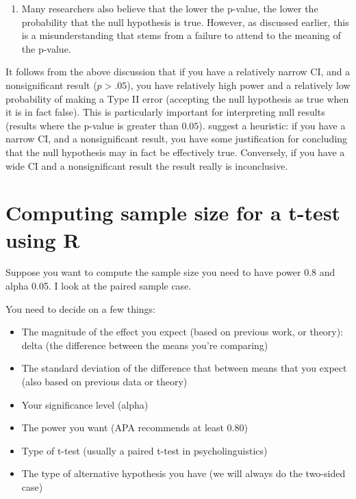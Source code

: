 \documentclass[12pt]{book}\usepackage[]{graphicx}\usepackage[]{color}
\begin{document}
\begin{enumerate}
\item
	Many researchers also believe that the lower the p-value, the lower the probability that the null hypothesis is true. However, as discussed earlier, this is a misunderstanding that stems from a
failure to attend to the meaning of the p-value.
\end{enumerate}

It follows from the above discussion that if you have a relatively narrow CI, and a nonsignificant result
($p > .05$), you have relatively high power and a relatively low
probability of making a Type II error (accepting the null hypothesis
as true when it is in fact false).
This is particularly important for interpreting null results (results where the p-value is greater than $0.05$).
\cite{hoenigheisey} suggest a heuristic: 
if you have a narrow CI, and a
nonsignificant result, you have some justification for concluding that
the null hypothesis may in fact be effectively true. Conversely, if you have a
wide CI and a nonsignificant result the result really is inconclusive.

\section{Computing sample size for a t-test using R}

Suppose you want to compute the sample size you need to have power 0.8 and alpha 0.05. I look at the paired sample case.

You need to decide on a few things:

\begin{itemize}
\item The magnitude of the effect you expect (based on previous work, or theory): delta (the difference between the means you're comparing)
\item  The standard deviation of the difference that between means that you expect (also based on previous data or theory)
\item Your significance level (alpha)
\item The power you want (APA recommends at least 0.80)
\item Type of t-test (usually a paired t-test in psycholinguistics)
\item The type of alternative hypothesis you have (we will always do the two-sided case)
\end{itemize}
\end{document}
